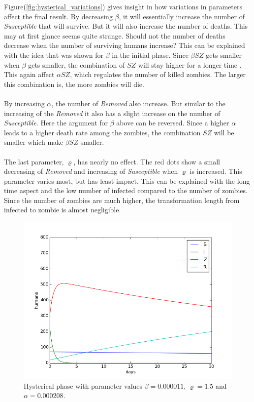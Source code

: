 \documentclass[%
twoside,                 %
final,                   %
10pt]{article}
\begin{document}
Figure(\ref{fig:hysterical_variations}) gives insight in how variations in parameters affect the final result. By decreasing $\beta$, it will essentially increase the number of \emph{Susceptible} that will survive. But it will also increase the number of deaths. This may at first glance seems quite strange. Should not the number of deaths decrease when the number of surviving humans increase? This can be explained with the idea that was shown for $\beta$ in the initial phase. Since $\beta SZ$ gets smaller when $\beta$ gets smaller, the combination of $SZ$ will stay higher for a longer time . This again affect $\alpha SZ$, which regulates the number of killed zombies. The larger this combination is, the more zombies will die. 
\\
\\
By increasing $\alpha$, the number of \emph{Removed} also increase. But similar to the increasing of the \emph{Removed} it also has a slight increase on the number of \emph{Susceptible}. Here the argument for $\beta$ above can be reversed. Since a higher $\alpha$ leads to a higher death rate among the zombies, the combination $SZ$ will be smaller which make $\beta SZ$ smaller.
\\
\\
The last parameter, $\varrho$, has nearly no effect. The red dots show a small decreasing of \emph{Removed} and increasing of \emph{Susceptible}  when $\varrho$ is increased. This parameter varies most, but has least impact. This can be explained with the long time aspect and the low number of infected compared to the number of zombies. Since the number of zombies are much higher, the transformation length from infected to zombie is almost negligible.  


\begin{figure}[ht]
  \centerline{\includegraphics[width=0.9\linewidth]{plots/WD_zombie_hysterical_1.png}}
  \caption{
  \label{fig:hysterical_1} Hysterical phase with parameter values $\beta = 0.000011$, $\varrho = 1.5$ and $\alpha = 0.000208$.
  }
\end{figure}
\end{document}
